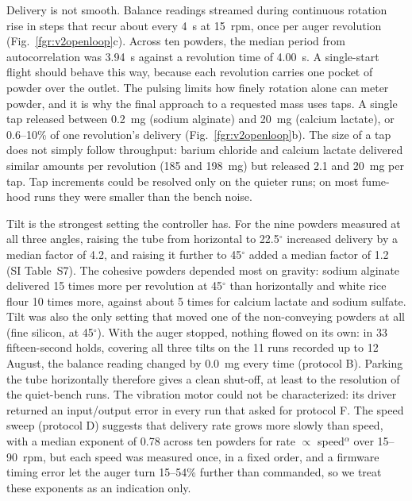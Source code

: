 \documentclass[twoside,twocolumn,9pt]{article}
\begin{document}
Delivery is not smooth. Balance readings streamed during continuous rotation rise in steps that recur about every 4~s at 15~rpm, once per auger revolution (Fig.~\ref{fgr:v2openloop}c). Across ten powders, the median period from autocorrelation was 3.94~s against a revolution time of 4.00~s. A single-start flight should behave this way, because each revolution carries one pocket of powder over the outlet. The pulsing limits how finely rotation alone can meter powder, and it is why the final approach to a requested mass uses taps. A single tap released between 0.2~mg (sodium alginate) and 20~mg (calcium lactate), or 0.6--10\% of one revolution's delivery (Fig.~\ref{fgr:v2openloop}b). The size of a tap does not simply follow throughput: barium chloride and calcium lactate delivered similar amounts per revolution (185 and 198~mg) but released 2.1 and 20~mg per tap. Tap increments could be resolved only on the quieter runs; on most fume-hood runs they were smaller than the bench noise.

Tilt is the strongest setting the controller has. For the nine powders measured at all three angles, raising the tube from horizontal to 22.5$^\circ$ increased delivery by a median factor of 4.2, and raising it further to 45$^\circ$ added a median factor of 1.2 (SI Table~S7). The cohesive powders depended most on gravity: sodium alginate delivered 15 times more per revolution at 45$^\circ$ than horizontally and white rice flour 10 times more, against about 5 times for calcium lactate and sodium sulfate. Tilt was also the only setting that moved one of the non-conveying powders at all (fine silicon, at 45$^\circ$). With the auger stopped, nothing flowed on its own: in 33 fifteen-second holds, covering all three tilts on the 11 runs recorded up to 12 August, the balance reading changed by 0.0~mg every time (protocol B). Parking the tube horizontally therefore gives a clean shut-off, at least to the resolution of the quiet-bench runs. The vibration motor could not be characterized: its driver returned an input/output error in every run that asked for protocol F. The speed sweep (protocol D) suggests that delivery rate grows more slowly than speed, with a median exponent of 0.78 across ten powders for rate $\propto$ speed$^{\alpha}$ over 15--90~rpm, but each speed was measured once, in a fixed order, and a firmware timing error let the auger turn 15--54\% further than commanded, so we treat these exponents as an indication only.
\end{document}
